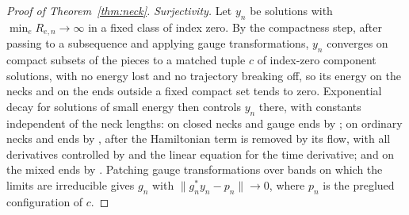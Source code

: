 \documentclass[11pt]{amsart}
\theoremstyle{definition}
\theoremstyle{remark}
\theoremstyle{plain}
\numberwithin{equation}{section}
\begin{document}
\begin{proof}[Proof of Theorem~\ref{thm:neck}]
\emph{Surjectivity.} Let $y_n$ be solutions with $\min_eR_{e,n}\to\infty$ in a fixed class of
index zero. By the compactness step, after passing to a subsequence and applying gauge
transformations, $y_n$ converges on compact subsets of the pieces to a matched tuple $c$ of
index-zero component solutions, with no energy lost and no trajectory breaking off, so its
energy on the necks and on the ends outside a fixed compact set tends to zero. Exponential decay for solutions of small energy
then controls $y_n$ there, with constants independent of the neck lengths: on closed necks and
gauge ends by \cite[Propositions~4.3--4.4 and Section~5.5]{Donaldson-book}; on ordinary necks
and ends by \cite[Proposition~2.3.1]{Simcevic}, after the Hamiltonian term is removed by its
flow, with all derivatives controlled by \cite[Lemma~C.3]{RS-strips} and the linear equation for
the time derivative; and on the mixed ends by \cite[Proposition~5.29]{DFL}. Patching gauge
transformations over bands on which the limits are irreducible gives $g_n$ with
$\|g_n^*y_n-p_n\|\to0$, where $p_n$ is the preglued configuration of $c$.


\end{proof}
\end{document}
